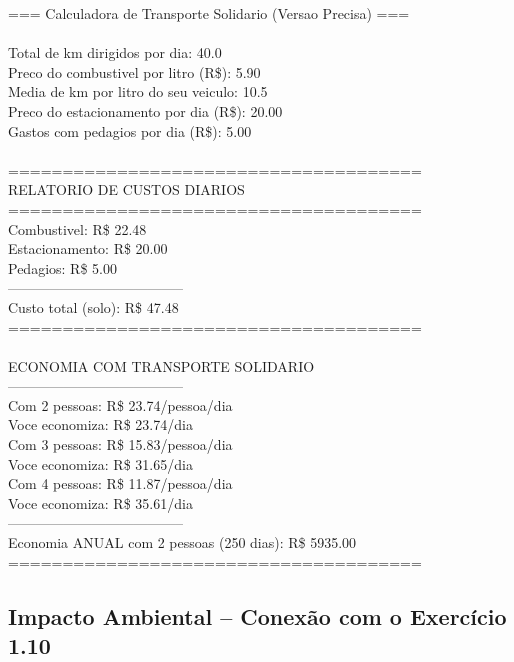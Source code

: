 \documentclass[12pt,a4paper]{article}
\begin{document}
\begin{respostabox}
\begin{saida}
=== Calculadora de Transporte Solidario (Versao Precisa) ===\\
\\
Total de km dirigidos por dia: 40.0\\
Preco do combustivel por litro (R\$): 5.90\\
Media de km por litro do seu veiculo: 10.5\\
Preco do estacionamento por dia (R\$): 20.00\\
Gastos com pedagios por dia (R\$): 5.00\\
\\
======================================\\
   RELATORIO DE CUSTOS DIARIOS\\
======================================\\
Combustivel:       R\$ 22.48\\
Estacionamento:    R\$ 20.00\\
Pedagios:          R\$ 5.00\\
--------------------------------------\\
Custo total (solo): R\$ 47.48\\
======================================\\
\\
   ECONOMIA COM TRANSPORTE SOLIDARIO\\
--------------------------------------\\
Com 2 pessoas:  R\$ 23.74/pessoa/dia\\
  Voce economiza: R\$ 23.74/dia\\
Com 3 pessoas: R\$ 15.83/pessoa/dia\\
  Voce economiza: R\$ 31.65/dia\\
Com 4 pessoas:  R\$ 11.87/pessoa/dia\\
  Voce economiza: R\$ 35.61/dia\\
--------------------------------------\\
Economia ANUAL com 2 pessoas (250 dias): R\$ 5935.00\\
======================================
\end{saida}
\end{respostabox}

\subsection{Impacto Ambiental -- Conexão com o Exercício 1.10}
\end{document}
